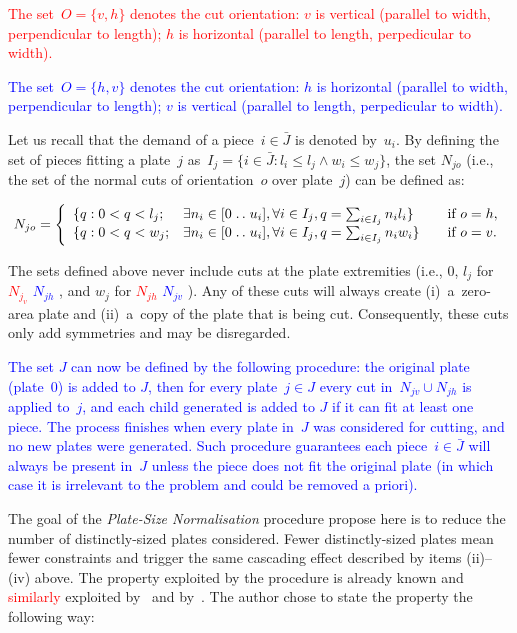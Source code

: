 \documentclass[ppgc,tese,english,formais,babel]{iiufrgs}
\newif\iffinalversion
\newcommand{\newtext}[1]{\iffinalversion%
#1%
\else%
\textcolor{blue}{#1}%
\fi%
}
\newcommand{\oldtext}[1]{\iffinalversion%
\else%
\textcolor{red}{#1}%
\fi%
}
\newcommand{\isep}{\mathrel{{.}\,{.}}\nobreak} %
\begin{document}
\oldtext{The set~\(O = \{v, h\}\) denotes the cut orientation: \(v\) is vertical (parallel to width, perpendicular to length); \(h\) is horizontal (parallel to length, perpedicular to width).}
\newtext{The set~\(O = \{h, v\}\) denotes the cut orientation: \(h\) is horizontal (parallel to width, perpendicular to length); \(v\) is vertical (parallel to length, perpedicular to width).}
Let us recall that the demand of a piece~\(i \in \bar{J}\) is denoted by~\(u_i\).
By defining the set of pieces fitting a plate~\(j\) as~\(I_j = \{i \in \bar{J} : l_i \leq l_j \land w_i \leq w_j \}\), the set \(N_{jo}\) (i.e., the set of the normal cuts of orientation~\(o\) over plate~\(j\)) can be defined as:

{\iffinalversion\else\color{blue}\fi
\begin{equation}
N_{jo}= \left\{
\begin{array}{lllr}
  \{q: 0 < q < l_j; & \exists n_i \in [0 \isep u_i], \forall i \in I_j, q = \sum_{i\in I_j} n_i l_i \} & \quad \text{if } o = h,\\
  \{q: 0 < q < w_j; & \exists n_i \in [0 \isep u_i], \forall i \in I_j, q = \sum_{i\in I_j} n_i w_i \} & \quad \text{if } o = v.
\end{array}\right.
\end{equation}
}

The sets defined above never include cuts at the plate extremities (i.e., \(0\), \(l_j\) for \oldtext{\(N_{j_v}\)}\newtext{\(N_{jh}\)}, and \(w_j\) for \oldtext{\(N_{jh}\)}\newtext{\(N_{jv}\)}).
Any of these cuts will always create (i)~a~zero-area plate and (ii)~a~copy of the plate that is being cut.
Consequently, these cuts only add symmetries and may be disregarded.

\newtext{
The set \(J\) can now be defined by the following procedure: the original plate (plate~\(0\)) is added to \(J\), then for every plate~\(j \in J\) every cut in~\(N_{jv} \cup N_{jh}\) is applied to~\(j\), and each child generated is added to \(J\) if it can fit at least one piece.
The process finishes when every plate in~\(J\) was considered for cutting, and no new plates were generated.
Such procedure guarantees each piece~\(i \in \bar{J}\) will always be present in~\(J\) unless the piece does not fit the original plate (in which case it is irrelevant to the problem and could be removed a priori).
}

The goal of the \emph{Plate-Size Normalisation} procedure propose here is to reduce the number of distinctly-sized plates considered.
Fewer distinctly-sized plates mean fewer constraints and trigger the same cascading effect described by items (ii)--(iv) above.
The property exploited by the procedure is already known and \oldtext{similarly} exploited by~\citet{alvarez:2009} and by~\citet{dolatabadi:2012}.
The author chose to state the property the following way:
\end{document}
